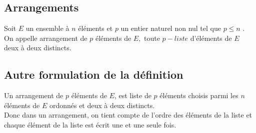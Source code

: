 \subsection{Arrangements}
\begin{definition}
Soit $ E $ un ensemble à $ n $ éléments et $ p $ un entier naturel non nul tel que $p\leq n  $ .\\
On appelle  arrangement  de $ p  $ éléments  de $ E,$ toute $ p-liste $ d'éléments de $ E $ deux à deux distincts.
\end{definition}
\subsection*{Autre formulation de la définition}
Un arrangement de $ p $ éléments de $ E $, est liste  de $ p $ éléments choisis parmi les $ n $ éléments de $ E $ ordonnés et deux à deux  distincts.\\
Donc dans un arrangement, on tient compte de l'ordre des éléments de la liste et chaque élément de la liste est  écrit une et une seule fois.

